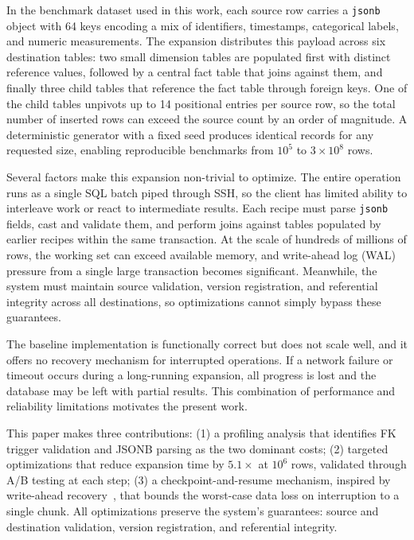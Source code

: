 \documentclass[journal]{IEEEtran}
\begin{document}
In the benchmark dataset used in this work, each source row carries a \texttt{jsonb} object with 64 keys encoding a mix of identifiers, timestamps, categorical labels, and numeric measurements.
The expansion distributes this payload across six destination tables: two small dimension tables are populated first with distinct reference values, followed by a central fact table that joins against them, and finally three child tables that reference the fact table through foreign keys.
One of the child tables unpivots up to 14 positional entries per source row, so the total number of inserted rows can exceed the source count by an order of magnitude.
A deterministic generator with a fixed seed produces identical records for any requested size, enabling reproducible benchmarks from $10^5$ to $3 \times 10^8$ rows.

Several factors make this expansion non-trivial to optimize.
The entire operation runs as a single SQL batch piped through SSH, so the client has limited ability to interleave work or react to intermediate results.
Each recipe must parse \texttt{jsonb} fields, cast and validate them, and perform joins against tables populated by earlier recipes within the same transaction.
At the scale of hundreds of millions of rows, the working set can exceed available memory, and write-ahead log (WAL) pressure from a single large transaction becomes significant.
Meanwhile, the system must maintain source validation, version registration, and referential integrity across all destinations, so optimizations cannot simply bypass these guarantees.

The baseline implementation is functionally correct but does not scale well, and it offers no recovery mechanism for interrupted operations.
If a network failure or timeout occurs during a long-running expansion, all progress is lost and the database may be left with partial results.
This combination of performance and reliability limitations motivates the present work.

This paper makes three contributions:
(1) a profiling analysis that identifies FK trigger validation and JSONB parsing as the two dominant costs;
(2) targeted optimizations that reduce expansion time by $5.1\times$ at $10^6$ rows, validated through A/B testing at each step;
(3) a checkpoint-and-resume mechanism, inspired by write-ahead recovery~\cite{mohan1992aries}, that bounds the worst-case data loss on interruption to a single chunk.
All optimizations preserve the system's guarantees: source and destination validation, version registration, and referential integrity.
\end{document}
